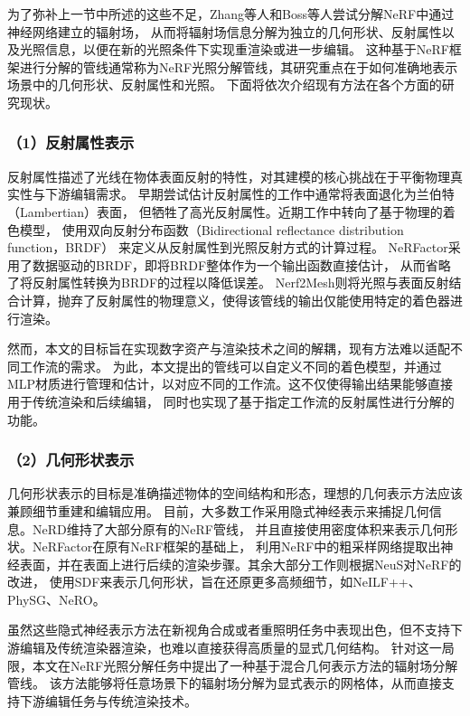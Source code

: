 为了弥补上一节中所述的这些不足，Zhang等人\cite{Zhang_2021}和Boss等人\cite{Boss_2021}尝试分解NeRF中通过神经网络建立的辐射场，
从而将辐射场信息分解为独立的几何形状、反射属性以及光照信息，以便在新的光照条件下实现重渲染或进一步编辑。
这种基于NeRF框架进行分解的管线通常称为NeRF光照分解管线，其研究重点在于如何准确地表示场景中的几何形状、反射属性和光照。
下面将依次介绍现有方法在各个方面的研究现状。

\subsubsection*{（1）反射属性表示}

反射属性描述了光线在物体表面反射的特性，对其建模的核心挑战在于平衡物理真实性与下游编辑需求。
早期尝试估计反射属性的工作\cite{Sato_1997, Zollh_fer_2015}中通常将表面退化为兰伯特（Lambertian）表面，
但牺牲了高光反射属性。近期工作\cite{Zhang_2023,10.5555/3600270.3601931}中转向了基于物理的着色模型，
使用双向反射分布函数（Bidirectional reflectance distribution function，BRDF）
\cite{Cook_1981}来定义从反射属性到光照反射方式的计算过程。
NeRFactor\cite{zhang2021nerfactor}采用了数据驱动的BRDF，即将BRDF整体作为一个输出函数直接估计，
从而省略了将反射属性转换为BRDF的过程以降低误差。
Nerf2Mesh\cite{Tang_2023}则将光照与表面反射结合计算，抛弃了反射属性的物理意义，使得该管线的输出仅能使用特定的着色器进行渲染。

然而，本文的目标旨在实现数字资产与渲染技术之间的解耦，现有方法难以适配不同工作流的需求。
为此，本文提出的管线可以自定义不同的着色模型，并通过MLP材质进行管理和估计，以对应不同的工作流。这不仅使得输出结果能够直接用于传统渲染和后续编辑，
同时也实现了基于指定工作流的反射属性进行分解的功能。

\subsubsection*{（2）几何形状表示}

几何形状表示的目标是准确描述物体的空间结构和形态，理想的几何表示方法应该兼顾细节重建和编辑应用。
目前，大多数工作采用隐式神经表示来捕捉几何信息。NeRD\cite{Boss_2021}维持了大部分原有的NeRF管线，
并且直接使用密度体积来表示几何形状。NeRFactor\cite{zhang2021nerfactor}在原有NeRF框架的基础上，
利用NeRF中的粗采样网络提取出神经表面，并在表面上进行后续的渲染步骤。其余大部分工作则根据NeuS\cite{10.5555/3540261.3542342}对NeRF的改进，
使用SDF来表示几何形状，旨在还原更多高频细节，如NeILF++\cite{Zhang_2023}、PhySG\cite{Zhang_2021}、NeRO\cite{Liu_2023}。

虽然这些隐式神经表示方法在新视角合成或者重照明任务中表现出色，但不支持下游编辑及传统渲染器渲染，也难以直接获得高质量的显式几何结构。
针对这一局限，本文在NeRF光照分解任务中提出了一种基于混合几何表示方法的辐射场分解管线。
该方法能够将任意场景下的辐射场分解为显式表示的网格体，从而直接支持下游编辑任务与传统渲染技术。


